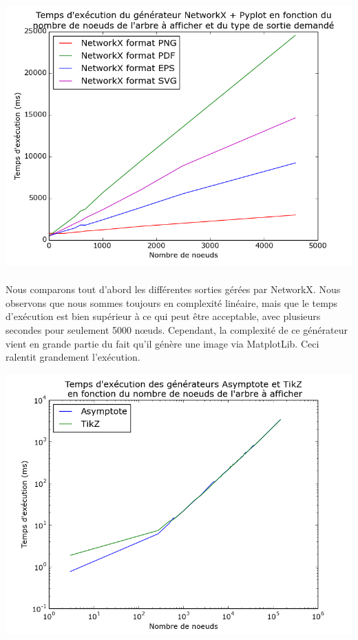 \begin{center}

\includegraphics[width=\columnwidth]{execTimeNX}

\end{center}

\paragraph{} Nous comparons tout d'abord les différentes sorties gérées par NetworkX. Nous observons que nous sommes toujours en complexité linéaire, mais que le temps d'exécution est bien supérieur à ce qui peut être acceptable, avec plusieurs secondes pour seulement 5000 n\oe uds. Cependant, la complexité de ce générateur vient en grande partie du fait qu'il génère une image via MatplotLib. Ceci ralentit grandement l'exécution.
	
\begin{center}

\includegraphics[width=\columnwidth]{execTimeGenerators}

\end{center}

